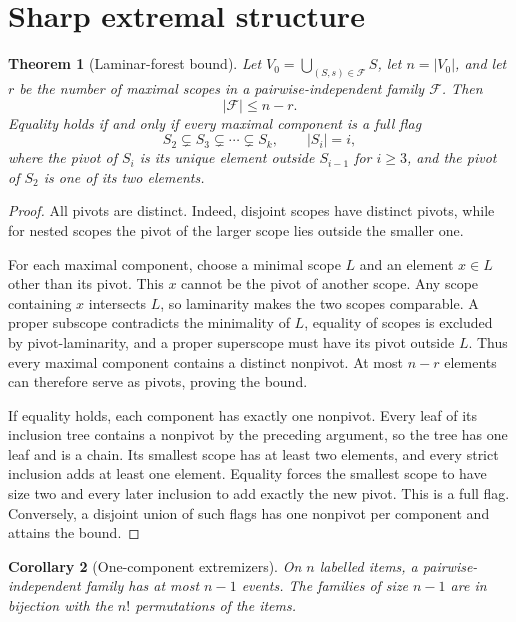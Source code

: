 \documentclass[11pt]{article}
\newtheorem{theorem}{Theorem}[section]
\newtheorem{corollary}[theorem]{Corollary}
\theoremstyle{definition}
\newcommand{\1}{\mathbf{1}}
\begin{document}
\section{Sharp extremal structure}

\begin{theorem}[Laminar-forest bound]
\label{thm:bound}
Let \(V_0=\bigcup_{(S,s)\in\mathcal F}S\), let \(n=|V_0|\), and let \(r\) be the number of maximal
scopes in a pairwise-independent family \(\mathcal F\). Then
\[
|\mathcal F|\leq n-r.
\]
Equality holds if and only if every maximal component is a full flag
\[
S_2\subsetneq S_3\subsetneq\cdots\subsetneq S_k,
\qquad |S_i|=i,
\]
where the pivot of \(S_i\) is its unique element outside \(S_{i-1}\) for \(i\geq3\), and the pivot
of \(S_2\) is one of its two elements.
\end{theorem}

\begin{proof}
All pivots are distinct. Indeed, disjoint scopes have distinct pivots, while for nested scopes the
pivot of the larger scope lies outside the smaller one.

For each maximal component, choose a minimal scope \(L\) and an element \(x\in L\) other than its
pivot. This \(x\) cannot be the pivot of another scope. Any scope containing \(x\) intersects \(L\),
so laminarity makes the two scopes comparable. A proper subscope contradicts the minimality of
\(L\), equality of scopes is excluded by pivot-laminarity, and a proper superscope must have its
pivot outside \(L\). Thus every maximal component
contains a distinct nonpivot. At most \(n-r\) elements can therefore serve as pivots, proving the
bound.

If equality holds, each component has exactly one nonpivot. Every leaf of its inclusion tree
contains a nonpivot by the preceding argument, so the tree has one leaf and is a chain. Its smallest
scope has at least two elements, and every strict inclusion adds at least one element. Equality
forces the smallest scope to have size two and every later inclusion to add exactly the new pivot.
This is a full flag. Conversely, a disjoint union of such flags has one nonpivot per component and
attains the bound.
\end{proof}

\begin{corollary}[One-component extremizers]
On \(n\) labelled items, a pairwise-independent family has at most \(n-1\) events. The families of
size \(n-1\) are in bijection with the \(n!\) permutations of the items.
\end{corollary}
\end{document}

